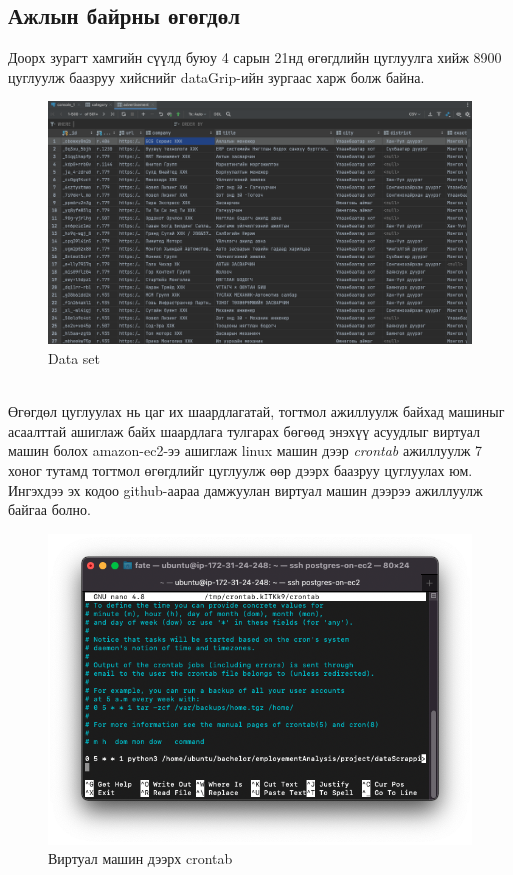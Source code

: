 \subsection{Ажлын байрны өгөгдөл}
Доорх зурагт хамгийн сүүлд буюу 4 сарын 21нд өгөгдлийн цуглуулга хийж 8900 цуглуулж баазруу хийснийг dataGrip-ийн зургаас харж болж байна. 
\begin{figure}[ht]
  \centering
  \includegraphics[width=\textwidth-4cm]{images/dataSet.png}
  \caption{Data set}\label{fig:dataSet1}
\end{figure}
\\Өгөгдөл цуглуулах нь цаг их шаардлагатай, тогтмол ажиллуулж байхад машиныг асаалттай ашиглаж байх шаардлага тулгарах бөгөөд энэхүү асуудлыг виртуал машин болох amazon-ec2-ээ ашиглаж linux машин дээр \textit{crontab} ажиллуулж 7 хоног тутамд тогтмол өгөгдлийг цуглуулж өөр дээрх баазруу цуглуулах юм. Ингэхдээ эх кодоо github-аараа дамжуулан виртуал машин дээрээ ажиллуулж байгаа болно. 
\begin{figure}[ht]
  \centering
  \includegraphics[width=\textwidth-4cm]{images/crontab.png}
  \caption{Виртуал машин дээрх crontab}\label{fig:crontab}
\end{figure}
\newpage
